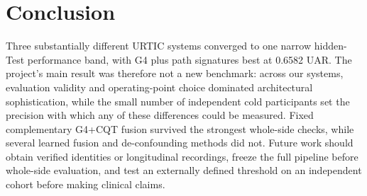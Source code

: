 \section{Conclusion}
\label{sec:conclusion}

Three substantially different URTIC systems converged to one narrow hidden-
Test performance band, with G4 plus path signatures best at 0.6582 UAR. The
project's main result was therefore not a new benchmark: across our systems,
evaluation validity and operating-point choice dominated architectural
sophistication, while the small number of independent cold participants set
the precision with which any of these differences could be measured. Fixed complementary G4+CQT fusion survived the
strongest whole-side checks, while several learned fusion and de-confounding
methods did not. Future work should obtain verified identities or longitudinal
recordings, freeze the full pipeline before whole-side evaluation, and test an
externally defined threshold on an independent cohort before making clinical
claims.
